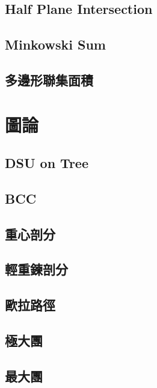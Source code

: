 \documentclass[a4paper,10pt,twocolumn,oneside]{article}
\begin{document}
\subsection{Half Plane Intersection}

\subsection{Minkowski Sum}

\subsection{多邊形聯集面積}

%


\section{圖論}
\subsection{DSU on Tree}

\subsection{BCC}

\subsection{重心剖分}

\subsection{輕重鍊剖分}

\subsection{歐拉路徑}

\subsection{極大團}

\subsection{最大團}

\end{document}
